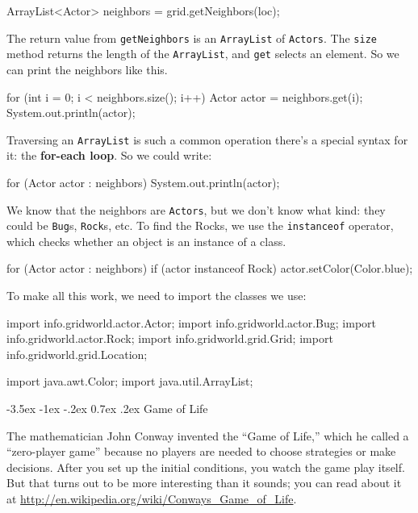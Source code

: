 \documentclass[12pt]{book}
\makeatletter
\renewcommand{\section}{\@startsection {section}{1}{\z@}%
    {-3.5ex \@plus -1ex \@minus -.2ex}%
    {0.7ex \@plus.2ex}%
    {\normalfont\Large\bfseries}}
\theoremstyle{exercise}
\newcommand{\java}[1]{\lstinline{#1}} %
\makeatother
\begin{document}
\begin{code}
    ArrayList<Actor> neighbors = grid.getNeighbors(loc);
\end{code}

The return value from \java{getNeighbors} is an \java{ArrayList} of \java{Actors}.
The \java{size} method returns the length of the \java{ArrayList}, and \java{get} selects an element.
So we can print the neighbors like this.

\begin{code}
        for (int i = 0; i < neighbors.size(); i++) {
            Actor actor = neighbors.get(i);
            System.out.println(actor);
        }
\end{code}

Traversing an \java{ArrayList} is such a common operation there's a special syntax for it: the {\bf for-each loop}.
So we could write:

\begin{code}
        for (Actor actor : neighbors) {
            System.out.println(actor);
        }
\end{code}

We know that the neighbors are \java{Actors}, but we don't know what kind: they could be \java{Bug}s, \java{Rock}s, etc.
To find the Rocks, we use the \java{instanceof} operator, which checks whether an object is an instance of a class.

\begin{code}
        for (Actor actor : neighbors) {
            if (actor instanceof Rock) {
                actor.setColor(Color.blue);
            }
        }
\end{code}

To make all this work, we need to import the classes we use:

\begin{code}
import info.gridworld.actor.Actor;
import info.gridworld.actor.Bug;
import info.gridworld.actor.Rock;
import info.gridworld.grid.Grid;
import info.gridworld.grid.Location;

import java.awt.Color;
import java.util.ArrayList;
\end{code}


\section{Game of Life}

The mathematician John Conway invented the ``Game of Life,'' which he called a ``zero-player game'' because no players are needed to choose strategies or make decisions.
After you set up the initial conditions, you watch the game play itself.
But that turns out to be more interesting than it sounds; you can read about it at \url{http://en.wikipedia.org/wiki/Conways_Game_of_Life}.
\end{document}
